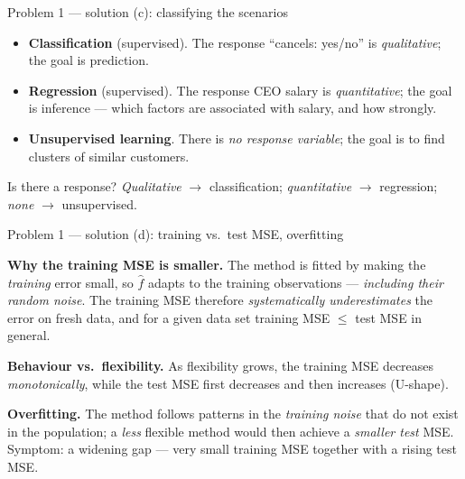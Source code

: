 \documentclass[aspectratio=169,11pt]{beamer}
\begin{document}
\begin{frame}{Problem 1 --- solution (c): classifying the scenarios}
  \begin{solutionbox}
    \begin{itemize}
      \item[(i)] \textbf{Classification} (supervised). The response ``cancels: yes/no'' is
        \emph{qualitative}; the goal is prediction.
      \item[(ii)] \textbf{Regression} (supervised). The response CEO salary is \emph{quantitative};
        the goal is inference --- which factors are associated with salary, and how strongly.
      \item[(iii)] \textbf{Unsupervised learning}. There is \emph{no response variable}; the goal
        is to find clusters of similar customers.
    \end{itemize}
  \end{solutionbox}
  \begin{takeaway}
    Is there a response? \emph{Qualitative} $\to$ classification; \emph{quantitative} $\to$
    regression; \emph{none} $\to$ unsupervised.
  \end{takeaway}
\end{frame}

\begin{frame}{Problem 1 --- solution (d): training vs.\ test MSE, overfitting}
  \begin{solutionbox}
    \textbf{Why the training MSE is smaller.} The method is fitted by making the \emph{training}
    error small, so $\hat f$ adapts to the training observations --- \emph{including their random
    noise}. The training MSE therefore \emph{systematically underestimates} the error on fresh
    data, and for a given data set training MSE $\le$ test MSE in general.
    \medskip

    \textbf{Behaviour vs.\ flexibility.} As flexibility grows, the training MSE decreases
    \emph{monotonically}, while the test MSE first decreases and then increases (U-shape).
    \medskip

    \textbf{Overfitting.} The method follows patterns in the \emph{training noise} that do not
    exist in the population; a \emph{less} flexible method would then achieve a \emph{smaller
    test} MSE. Symptom: a widening gap --- very small training MSE together with a rising test MSE.
  \end{solutionbox}
\end{frame}
\end{document}

